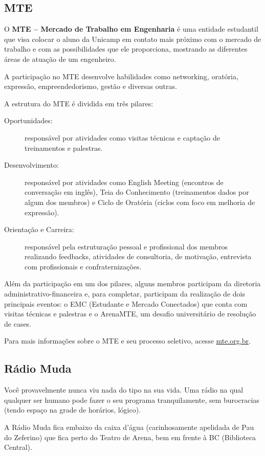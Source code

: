 \subsection{MTE}

O \textbf{MTE -- Mercado de Trabalho em Engenharia} é uma entidade estudantil que visa colocar o aluno da Unicamp em
contato mais próximo com o mercado de trabalho e com as possibilidades que ele
proporciona, mostrando as diferentes áreas de atuação de um engenheiro.

A participação no MTE desenvolve habilidades como networking, oratória, expressão, empreendedorismo, gestão e diversas outras.

A estrutura do MTE é dividida em três pilares:

\begin{description}
\item[Oportunidades:] responsável por atividades como visitas técnicas e captação de treinamentos e palestras.
\item[Desenvolvimento:] responsável por atividades como English Meeting (encontros de conversação em inglês), Teia do Conhecimento (treinamentos dados por algum dos membros) e Ciclo de Oratória (ciclos com foco em melhoria de expressão).
\item[Orientação e Carreira:] responsável pela estruturação pessoal e profissional dos membros realizando feedbacks, atividades de consultoria, de motivação, entrevista com profissionais e confraternizações.
\end{description}

Além da participação em um dos pilares, alguns membros participam da diretoria administrativo-financeira e, para completar, participam da realização de dois principais eventos: o EMC (Estudante e Mercado Conectados) que conta com visitas técnicas e palestras e o ArenaMTE, um desafio universitário de resolução de cases.

Para mais informações sobre o MTE e seu processo seletivo, acesse
\url{mte.org.br}.

\subsection{Rádio Muda}

Você provavelmente nunca viu nada do tipo na sua vida. Uma rádio na qual
qualquer ser humano pode fazer o seu programa tranquilamente, sem burocracias
(tendo espaço na grade de horários, lógico).

A Rádio Muda fica embaixo da caixa d'água (carinhosamente apelidada de Pau do
Zeferino) que fica perto do Teatro de Arena, bem em frente à BC (Biblioteca
Central).


